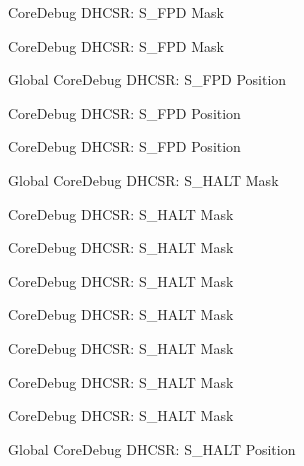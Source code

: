 \begin{DoxyRefList}
\label{deprecated__deprecated000465}%
%
Core\+Debug DHCSR\+: S\+\_\+\+FPD Mask 

\label{deprecated__deprecated000014}%
%
Core\+Debug DHCSR\+: S\+\_\+\+FPD Mask  
\item[Global \doxylink{group___c_m_s_i_s___s_c_b_ga620b141720c475f5bde4138855c6ed83}{Core\+Debug\+\_\+\+DHCSR\+\_\+\+S\+\_\+\+FPD\+\_\+\+Pos} ]\label{deprecated__deprecated000464}%
%
Core\+Debug DHCSR\+: S\+\_\+\+FPD Position 

\label{deprecated__deprecated000013}%
%
Core\+Debug DHCSR\+: S\+\_\+\+FPD Position 

\label{deprecated__deprecated000566}%
%
Core\+Debug DHCSR\+: S\+\_\+\+FPD Position  
\item[Global \doxylink{group___c_m_s_i_s___core_debug_ga9f881ade3151a73bc5b02b73fe6473ca}{Core\+Debug\+\_\+\+DHCSR\+\_\+\+S\+\_\+\+HALT\+\_\+\+Msk} ]\label{deprecated__deprecated000477}%
%
Core\+Debug DHCSR\+: S\+\_\+\+HALT Mask 

\label{deprecated__deprecated000118}%
%
Core\+Debug DHCSR\+: S\+\_\+\+HALT Mask 

\label{deprecated__deprecated000172}%
%
Core\+Debug DHCSR\+: S\+\_\+\+HALT Mask 

\label{deprecated__deprecated000579}%
%
Core\+Debug DHCSR\+: S\+\_\+\+HALT Mask 

\label{deprecated__deprecated000314}%
%
Core\+Debug DHCSR\+: S\+\_\+\+HALT Mask 

\label{deprecated__deprecated000390}%
%
Core\+Debug DHCSR\+: S\+\_\+\+HALT Mask 

\label{deprecated__deprecated000257}%
%
Core\+Debug DHCSR\+: S\+\_\+\+HALT Mask 

\label{deprecated__deprecated000026}%
%
Core\+Debug DHCSR\+: S\+\_\+\+HALT Mask  
\item[Global \doxylink{group___c_m_s_i_s___core_debug_ga760a9a0d7f39951dc3f07d01f1f64772}{Core\+Debug\+\_\+\+DHCSR\+\_\+\+S\+\_\+\+HALT\+\_\+\+Pos} ]\label{deprecated__deprecated000313}%
%
Core\+Debug DHCSR\+: S\+\_\+\+HALT Position 


\end{DoxyRefList}

